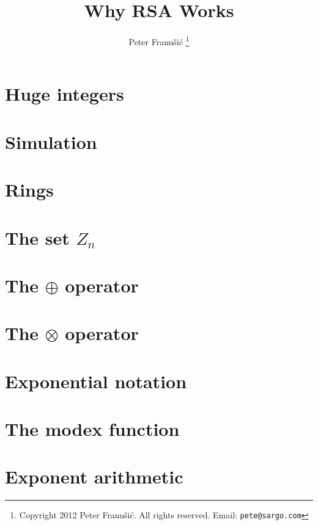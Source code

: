 \documentclass{article}
\title{\textbf{\huge{Why RSA Works}}}
\author{Peter Franu\v si\'c
  \footnote{
    Copyright 2012 Peter Franu\v si\'c.
    All rights reserved.
    Email: \texttt{pete@sargo.com}}}
\date{}
\begin{document}
\maketitle
\thispagestyle{empty}
\vspace{8ex}


\newpage
\section{Huge integers}


\newpage
\section{Simulation}


\newpage
\section{Rings}


\section{The set $Z_n$}


\newpage
\section{The $\oplus$ operator}


\newpage
\section{The $\otimes$ operator}


\newpage
\section{Exponential notation}


\newpage
\section{The modex function}


\newpage
\section{Exponent arithmetic}

\end{document}
